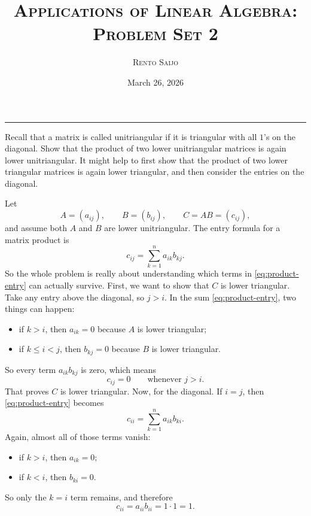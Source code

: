 \documentclass[10pt]{extarticle}
\title{\centering\Large\textsc{Applications of Linear Algebra: Problem Set 2}}
\author{\large \textsc{Rento Saijo}}
\date{March 26, 2026}
\begin{document}
\maketitle
\thispagestyle{fancy}
\vspace{-1em}\noindent\rule{\linewidth}{0.6pt}\vspace{0.5em}

\begin{problem}[Problem 1]
Recall that a matrix is called unitriangular if it is triangular with all $1$'s on the diagonal. Show that the product of two lower unitriangular matrices is again lower unitriangular. It might help to first show that the product of two lower triangular matrices is again lower triangular, and then consider the entries on the diagonal.
\end{problem}

Let
\[
A=(a_{ij}),\qquad B=(b_{ij}),\qquad C=AB=(c_{ij}),
\]
and assume both $A$ and $B$ are lower unitriangular. The entry formula for a matrix product is
\begin{equation}
c_{ij}=\sum_{k=1}^n a_{ik}b_{kj}.
\label{eq:product-entry}
\end{equation}
So the whole problem is really about understanding which terms in \eqref{eq:product-entry} can actually survive. First, we want to show that $C$ is lower triangular. Take any entry above the diagonal, so $j>i$. In the sum \eqref{eq:product-entry}, two things can happen:
\begin{itemize}[nosep]
\item if $k>i$, then $a_{ik}=0$ because $A$ is lower triangular;
\item if $k\le i<j$, then $b_{kj}=0$ because $B$ is lower triangular.
\end{itemize}
So every term $a_{ik}b_{kj}$ is zero, which means
\[
c_{ij}=0 \qquad \text{whenever } j>i.
\]
That proves $C$ is lower triangular. Now, for the diagonal. If $i=j$, then \eqref{eq:product-entry} becomes
\[
c_{ii}=\sum_{k=1}^n a_{ik}b_{ki}.
\]
Again, almost all of those terms vanish:
\begin{itemize}[nosep]
\item if $k>i$, then $a_{ik}=0$;
\item if $k<i$, then $b_{ki}=0$.
\end{itemize}
So only the $k=i$ term remains, and therefore
\begin{equation}
c_{ii}=a_{ii}b_{ii}=1\cdot 1=1.
\label{eq:unit-diagonal}
\end{equation}
\end{document}
